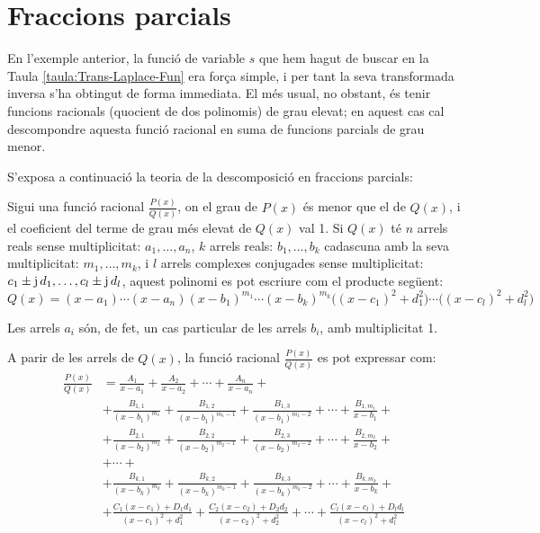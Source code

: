 \section{Fraccions parcials}

En l'exemple anterior, la funció de variable $s$ que hem hagut de
buscar en la Taula \vref{taula:Trans-Laplace-Fun} era força simple, i
per tant la seva transformada inversa s'ha obtingut de forma
immediata. El més usual, no obstant, és tenir funcions racionals
(quocient de dos polinomis) de grau elevat; en aquest cas cal
descompondre aquesta funció racional en suma de funcions parcials de
grau menor.

S'exposa a continuació la teoria de la descomposició en fraccions
parcials:

Sigui una funció racional $\frac{P(x)}{Q(x)}$, on el grau de $P(x)$
és menor que el de $Q(x)$, i el coeficient del terme de grau més
elevat de $Q(x)$ val 1. Si $Q(x)$ té $n$ arrels reals sense
multiplicitat: $a_1,\ldots,a_n$, $k$ arrels reals: $b_1,\ldots,b_k$
cadascuna amb la seva multiplicitat: $m_1,\ldots,m_k$, i $l$ arrels
complexes conjugades sense multiplicitat: $c_1\pm
\mathrm{j}\,d_1,\ldots,c_l\pm \mathrm{j}\,d_l$, aquest polinomi es pot escriure
com el producte següent:
\begin{equation}
    Q(x)= (x-a_1) \cdots (x-a_n)(x-b_1)^{m_1} \cdots (x-b_k)^{m_k}
    \bigl((x-c_1)^2+d_1^2\bigr)\cdots\bigl((x-c_l)^2+d_l^2\bigr)
\end{equation}

Les arrels $a_i$ són, de fet, un cas particular de les arrels $b_i$,
amb multiplicitat 1.

A parir de les arrels de $Q(x)$, la funció  racional
$\frac{P(x)}{Q(x)}$ es pot expressar com:
\begin{equation}\begin{split}
    \frac{P(x)}{Q(x)} &= \frac{A_1}{x-a_1} + \frac{A_2}{x-a_2}
    + \cdots + \frac{A_n}{x-a_n} +{} \\[1.5ex]
   &+ \frac{B_{1,1}}{(x-b_1)^{m_1}} + \frac{B_{1,2}}{(x-b_1)^{m_1-1}}
   + \frac{B_{1,3}}{(x-b_1)^{m_1-2}} + \cdots +
   \frac{B_{1,m_1}}{x-b_1}+{} \\[1.5ex]
&+ \frac{B_{2,1}}{(x-b_2)^{m_2}} + \frac{B_{2,2}}{(x-b_2)^{m_2-1}}
   + \frac{B_{2,3}}{(x-b_2)^{m_2-2}} + \cdots  +
   \frac{B_{2,m_2}}{x-b_2} +{}\\[1.5ex]
   &+ \cdots +\\[1ex]
&+ \frac{B_{k,1}}{(x-b_k)^{m_k}} + \frac{B_{k,2}}{(x-b_k)^{m_k-1}}
   + \frac{B_{k,3}}{(x-b_k)^{m_k-2}} + \cdots +
   \frac{B_{k,m_k}}{x-b_k}+{}\\[1.5ex]
&+ \frac{C_1(x-c_1)+D_1 d_1}{(x-c_1)^2+d_1^2}+ \frac{C_2(x-c_2)+D_2
d_2}{(x-c_2)^2+d_2^2} +  \cdots +\frac{C_l(x-c_l)+D_l d_l}{(x-c_l)^2+d_l^2}\\[1.5ex]
\end{split}\end{equation}

